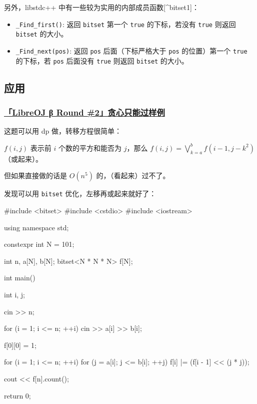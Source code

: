 另外，libstdc++ 中有一些较为实用的内部成员函数{[}\^{}bitset1{]}：

\begin{itemize}
\tightlist
\item
  \texttt{\_Find\_first()}: 返回 \texttt{bitset} 第一个 \texttt{true} 的下标，若没有 \texttt{true} 则返回 \texttt{bitset} 的大小。
\item
  \texttt{\_Find\_next(pos)}: 返回 \texttt{pos} 后面（下标严格大于 \texttt{pos} 的位置）第一个 \texttt{true} 的下标，若 \texttt{pos} 后面没有 \texttt{true} 则返回 \texttt{bitset} 的大小。
\end{itemize}

\subsection{应用}\label{ux5e94ux7528}

\subsubsection{\texorpdfstring{\href{https://loj.ac/problem/515}{「LibreOJ β Round \#2」贪心只能过样例}}{「LibreOJ β Round \#2」贪心只能过样例}}\label{libreoj-ux3b2-round-2ux8d2aux5fc3ux53eaux80fdux8fc7ux6837ux4f8b}

这题可以用 dp 做，转移方程很简单：

\(f(i,j)\) 表示前 \(i\) 个数的平方和能否为 \(j\)，那么 \(f(i,j)=\bigvee\limits_{k=a}^bf(i-1,j-k^2)\)（或起来）。

但如果直接做的话是 \(O(n^5)\) 的，（看起来）过不了。

发现可以用 \texttt{bitset} 优化，左移再或起来就好了：


\begin{codeline}
#include <bitset>
#include <cstdio>
#include <iostream>

using namespace std;

constexpr int N = 101;

int n, a[N], b[N];
bitset<N * N * N> f[N];

int main() {
    int i, j;

    cin >> n;

    for (i = 1; i <= n; ++i) cin >> a[i] >> b[i];

    f[0][0] = 1;

    for (i = 1; i <= n; ++i) {
    for (j = a[i]; j <= b[i]; ++j) {
        f[i] |= (f[i - 1] << (j * j));
    }
    }

    cout << f[n].count();

    return 0;
}
\end{codeline}


